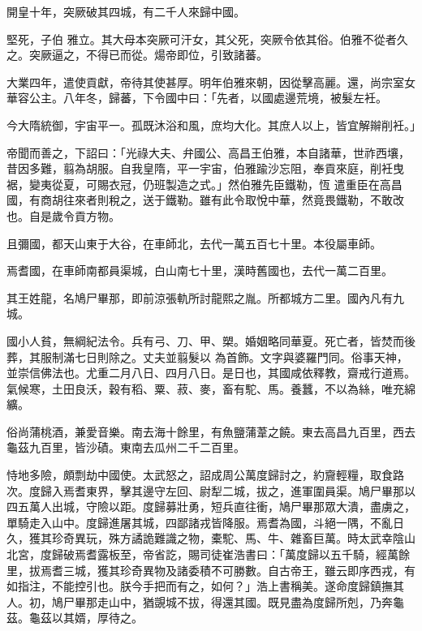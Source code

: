 \begin{pinyinscope}
 開皇十年，突厥破其四城，有二千人來歸中國。



 堅死，子伯
 雅立。其大母本突厥可汗女，其父死，突厥令依其俗。伯雅不從者久之。突厥逼之，不得已而從。煬帝即位，引致諸蕃。



 大業四年，遣使貢獻，帝待其使甚厚。明年伯雅來朝，因從擊高麗。還，尚宗室女華容公主。八年冬，歸蕃，下令國中曰：「先者，以國處邊荒境，被髮左衽。



 今大隋統御，宇宙平一。孤既沐浴和風，庶均大化。其庶人以上，皆宜解辮削衽。」



 帝聞而善之，下詔曰：「光祿大夫、弁國公、高昌王伯雅，本自諸華，世祚西壤，昔因多難，翦為胡服。自我皇隋，平一宇宙，伯雅踰沙忘阻，奉貢來庭，削衽曳裾，變夷從夏，可賜衣冠，仍班製造之式。」然伯雅先臣鐵勒，恆
 遣重臣在高昌國，有商胡往來者則稅之，送于鐵勒。雖有此令取悅中華，然竟畏鐵勒，不敢改也。自是歲令貢方物。



 且彌國，都天山東于大谷，在車師北，去代一萬五百七十里。本役屬車師。



 焉耆國，在車師南都員渠城，白山南七十里，漢時舊國也，去代一萬二百里。



 其王姓龍，名鳩尸畢那，即前涼張軌所討龍熙之胤。所都城方二里。國內凡有九城。



 國小人貧，無綱紀法令。兵有弓、刀、甲、槊。婚姻略同華夏。死亡者，皆焚而後葬，其服制滿七日則除之。丈夫並翦髮以
 為首飾。文字與婆羅門同。俗事天神，並崇信佛法也。尤重二月八日、四月八日。是日也，其國咸依釋教，齋戒行道焉。氣候寒，土田良沃，穀有稻、粟、菽、麥，畜有駝、馬。養蠶，不以為絲，唯充綿纊。



 俗尚蒲桃酒，兼愛音樂。南去海十餘里，有魚鹽蒲葦之饒。東去高昌九百里，西去龜茲九百里，皆沙磧。東南去瓜州二千二百里。



 恃地多險，頗剽劫中國使。太武怒之，詔成周公萬度歸討之，約齎輕糧，取食路次。度歸入焉耆東界，擊其邊守左回、尉犁二城，拔之，進軍圍員渠。鳩尸畢那以四五萬人出城，守險以距。度歸募壯勇，短兵直往衝，鳩尸畢那眾大潰，盡虜之，
 單騎走入山中。度歸進屠其城，四鄙諸戎皆降服。焉耆為國，斗絕一隅，不亂日久，獲其珍奇異玩，殊方譎詭難識之物，橐駝、馬、牛、雜畜巨萬。時太武幸陰山北宮，度歸破焉耆露板至，帝省訖，賜司徒崔浩書曰：「萬度歸以五千騎，經萬餘里，拔焉耆三城，獲其珍奇異物及諸委積不可勝數。自古帝王，雖云即序西戎，有如指注，不能控引也。朕今手把而有之，如何？」浩上書稱美。遂命度歸鎮撫其人。初，鳩尸畢那走山中，猶覬城不拔，得還其國。既見盡為度歸所剋，乃奔龜茲。龜茲以其婿，厚待之。




\end{pinyinscope}
